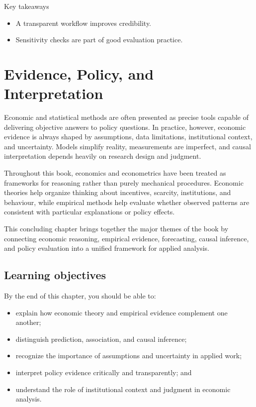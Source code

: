 \documentclass[
  11pt,
  oneside]{book}
\providecommand{\tightlist}{%
  \setlength{\itemsep}{0pt}\setlength{\parskip}{0pt}}
\begin{document}
Key takeaways

\begin{itemize}
\tightlist
\item
  A transparent workflow improves credibility.
\item
  Sensitivity checks are part of good evaluation practice.
\end{itemize}

\chapter{Evidence, Policy, and Interpretation}\label{evidence-policy}

Economic and statistical methods are often presented as precise tools capable of delivering objective answers to policy questions. In practice, however, economic evidence is always shaped by assumptions, data limitations, institutional context, and uncertainty. Models simplify reality, measurements are imperfect, and causal interpretation depends heavily on research design and judgment.

Throughout this book, economics and econometrics have been treated as frameworks for reasoning rather than purely mechanical procedures. Economic theories help organize thinking about incentives, scarcity, institutions, and behaviour, while empirical methods help evaluate whether observed patterns are consistent with particular explanations or policy effects.

This concluding chapter brings together the major themes of the book by connecting economic reasoning, empirical evidence, forecasting, causal inference, and policy evaluation into a unified framework for applied analysis.

\section{Learning objectives}\label{learning-objectives-8}

By the end of this chapter, you should be able to:

\begin{itemize}
\tightlist
\item
  explain how economic theory and empirical evidence complement one another;\\
\item
  distinguish prediction, association, and causal inference;\\
\item
  recognize the importance of assumptions and uncertainty in applied work;\\
\item
  interpret policy evidence critically and transparently; and\\
\item
  understand the role of institutional context and judgment in economic analysis.
\end{itemize}
\end{document}
